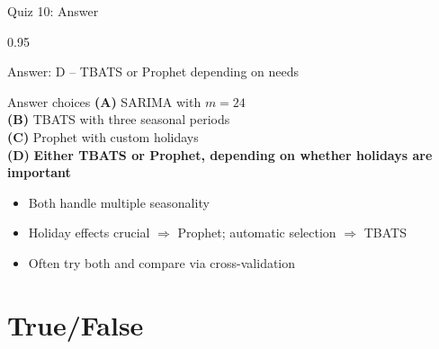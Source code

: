 \documentclass[9pt, aspectratio=169, t]{beamer}
\begin{document}
\begin{frame}{Quiz 10: Answer}
    \begin{cminipage}{0.95\textwidth}
    \begin{exampleblock}{Answer: D -- TBATS or Prophet depending on needs}

        \vspace{0.1cm}

    \begin{block}{Answer choices}
        \textcolor{MainBlue}{\textbf{(A)}} SARIMA with $m=24$ \incorrect\\[3pt]
        \textcolor{MainBlue}{\textbf{(B)}} TBATS with three seasonal periods \incorrect\\[3pt]
        \textcolor{MainBlue}{\textbf{(C)}} Prophet with custom holidays \incorrect\\[3pt]
        \textcolor{MainBlue}{\textbf{(D)}} \textbf{\textcolor{Forest}{Either TBATS or Prophet, depending on whether holidays are important}} \correct
    \end{block}

        \vspace{0.2cm}

        \begin{itemize}\setlength{\itemsep}{0pt}
            \item Both handle multiple seasonality
            \item Holiday effects crucial $\Rightarrow$ Prophet; automatic selection $\Rightarrow$ TBATS
            \item Often try both and compare via cross-validation
        \end{itemize}
    \end{exampleblock}

    \end{cminipage}
\end{frame}

\section{True/False}
\end{document}
